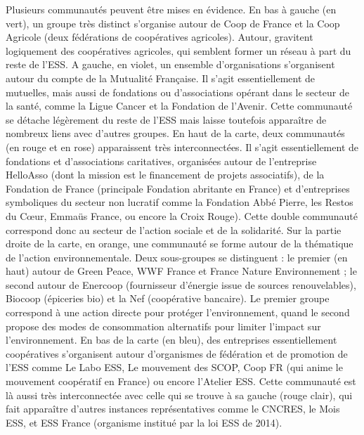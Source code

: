         Plusieurs communautés peuvent être mises en évidence. En bas à gauche (en vert), un groupe très distinct s’organise autour de Coop de France et la Coop Agricole (deux fédérations de coopératives agricoles). Autour, gravitent logiquement des coopératives agricoles, qui semblent former un réseau à part du reste de l’ESS.
        A gauche, en violet, un ensemble d’organisations s’organisent autour du compte de la Mutualité Française. Il s’agit essentiellement de mutuelles, mais aussi de fondations ou d’associations opérant dans le secteur de la santé, comme la Ligue Cancer et la Fondation de l’Avenir. Cette communauté se détache légèrement du reste de l’ESS mais laisse toutefois apparaître de nombreux liens avec d’autres groupes.
        En haut de la carte, deux communautés (en rouge et en rose) apparaissent très interconnectées. Il s’agit essentiellement de fondations et d’associations caritatives, organisées autour de l’entreprise HelloAsso (dont la mission est le financement de projets associatifs), de la Fondation de France (principale Fondation abritante en France) et d’entreprises symboliques du secteur non lucratif comme la Fondation Abbé Pierre, les Restos du Cœur, Emmaüs France, ou encore la Croix Rouge). Cette double communauté correspond donc au secteur de l’action sociale et de la solidarité.
        Sur la partie droite de la carte, en orange, une communauté se forme autour de la thématique de l’action environnementale. Deux sous-groupes se distinguent : le premier (en haut) autour de Green Peace, WWF France et France Nature Environnement ; le second autour de Enercoop (fournisseur d’énergie issue de sources renouvelables), Biocoop (épiceries bio) et la Nef (coopérative bancaire). Le premier groupe correspond à une action directe pour protéger l’environnement, quand le second propose des modes de consommation alternatifs pour limiter l’impact sur l’environnement.
        En bas de la carte (en bleu), des entreprises essentiellement coopératives s’organisent autour d’organismes de fédération et de promotion de l’ESS comme Le Labo ESS, Le mouvement des SCOP, Coop FR (qui anime le mouvement coopératif en France) ou encore l’Atelier ESS. Cette communauté est là aussi très interconnectée avec celle qui se trouve à sa gauche (rouge clair), qui fait apparaître d’autres instances représentatives comme le CNCRES, le Mois ESS, et ESS France (organisme institué par la loi ESS de 2014).
